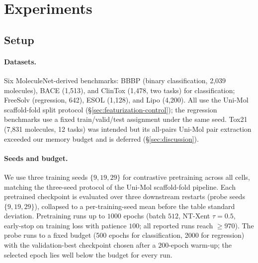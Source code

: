 \documentclass[sigconf,nonacm,anonymous,review]{acmart}
\begin{document}
\section{Experiments}
\label{sec:experiments}

\subsection{Setup}
\paragraph{Datasets.} Six MoleculeNet-derived benchmarks: BBBP (binary classification, 2{,}039 molecules), BACE (1{,}513), and ClinTox (1{,}478, two tasks) for classification; FreeSolv (regression, 642), ESOL (1{,}128), and Lipo (4{,}200). All use the Uni-Mol scaffold-fold split protocol (\S\ref{sec:featurization-control}); the regression benchmarks use a fixed train/valid/test assignment under the same seed. Tox21 (7{,}831 molecules, 12 tasks) was intended but its all-pairs Uni-Mol pair extraction exceeded our memory budget and is deferred (\S\ref{sec:discussion}).
\paragraph{Seeds and budget.} We use three training seeds $\{9,19,29\}$ for contrastive pretraining across all cells, matching the three-seed protocol of the Uni-Mol scaffold-fold pipeline. Each pretrained checkpoint is evaluated over three downstream restarts (probe seeds $\{9,19,29\}$), collapsed to a per-training-seed mean before the table standard deviation. Pretraining runs up to $1000$ epochs (batch $512$, NT-Xent $\tau{=}0.5$, early-stop on training loss with patience $100$; all reported runs reach $\ge 970$). The probe runs to a fixed budget (500 epochs for classification, 2000 for regression) with the validation-best checkpoint chosen after a $200$-epoch warm-up; the selected epoch lies well below the budget for every run.
\end{document}
